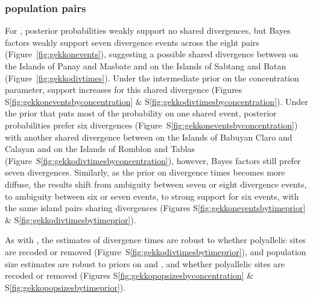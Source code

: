 \subsubsection{ population pairs}
For , posterior probabilities weakly support no shared divergences,
but Bayes factors weakly support seven divergence events across the eight pairs
(Figure~\ref{fig:gekkonevents}),
suggesting a possible shared divergence between
 on the Islands of Panay and Masbate
and
 on the Islands of Sabtang and Batan
(Figure~\ref{fig:gekkodivtimes}).
Under the intermediate prior on the concentration parameter, support
increases for this shared divergence 
(Figures
S\ref{fig:gekkoneventsbyconcentration}
\&
S\ref{fig:gekkodivtimesbyconcentration}).
Under the prior that puts most of the probability on one shared event,
posterior probabilities prefer six divergences
(Figure~S\ref{fig:gekkoneventsbyconcentration})
with another shared divergence between
 on the Islands of Babuyan Claro and Calayan
and
 on the Islands of Romblon and Tablas
(Figure~S\ref{fig:gekkodivtimesbyconcentration}), however,
Bayes factors still prefer seven divergences.
Similarly, as the prior on divergence times becomes more diffuse,
the results shift from ambiguity between seven or eight divergence
events, to ambiguity between six or seven events, to strong
support for six events, with the same island pairs sharing
divergences
(Figures
S\ref{fig:gekkoneventsbytimeprior}
\&
S\ref{fig:gekkodivtimesbytimeprior}).

\ifembed{

}{}

\ifembed{

}{}

As with , the estimates of divergence times
are robust to whether polyallelic sites are recoded or removed
(Figure~S\ref{fig:gekkodivtimesbytimeprior}),
and population size estimates are robust to 
priors on \concentration and \divtime, and whether polyallelic sites
are recoded or removed
(Figures
S\ref{fig:gekkopopsizesbyconcentration}
\&
S\ref{fig:gekkopopsizesbytimeprior}).



